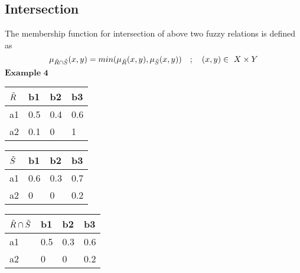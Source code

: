 \documentclass{article}
\begin{document}
\subsection{Intersection}
The membership function for intersection of above two fuzzy relations is defined as
\begin{equation}
\mu_{\Tilde{R}\cap\Tilde{S}}(x,y)=min(\mu_{\Tilde{R}}(x,y),\mu_{\Tilde{S}}(x,y)) \quad  ;\quad (x,y)\in\ X\times Y    
\end{equation}
$\textbf{Example 4}$\newline
\begin{center}
\def\arraystretch{1.4}%
\begin{tabular}{ | m{1cm} | m{1cm}| m{1cm} |m{1cm} | } 
  \hline
  $\Tilde{R}$& b1 & b2 & b3 \\ 
  \hline
  a1  & 0.5 & 0.4 & 0.6 \\ 
  \hline
  a2 & 0.1 & 0 & 1 \\ 
  \hline
\end{tabular}
\quad
\def\arraystretch{1.4}%
\begin{tabular}{ | m{1cm} | m{1cm}| m{1cm} | m{1cm} |} 
  \hline
  $\Tilde{S}$& b1 & b2 & b3 \\ 
  \hline
  a1  & 0.6 & 0.3 & 0.7 \\ 
  \hline
  a2 & 0 & 0 & 0.2 \\ 
  \hline
\end{tabular}
\end{center}
\begin{center}
\def\arraystretch{1.4}%
\begin{tabular}{ | m{1cm} | m{1cm}| m{1cm} |m{1cm} | } 
  \hline
  $\Tilde{R}\cap\Tilde{S}$& b1 & b2 & b3\\ 
  \hline
  a1  & 0.5 & 0.3 & 0.6 \\ 
  \hline
  a2 & 0 & 0 & 0.2 \\ 
  \hline
\end{tabular}
\end{center}
\end{document}
